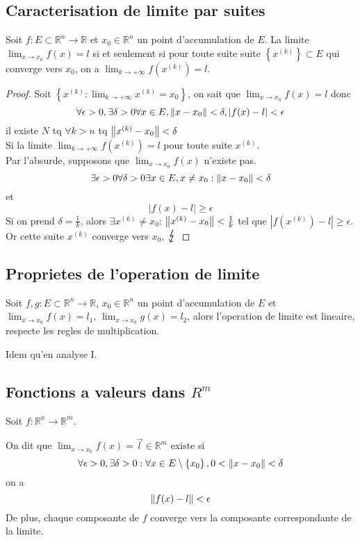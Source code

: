 \documentclass[../main.tex]{subfiles}
\begin{document}
\subsection{Caracterisation de limite par suites}
\begin{thm}\label{thm:Limites/Suiteslimites_suites}
	Soit $f:E \subset \mathbb{R}^n \to \mathbb{R}$ et $x_0 \in \mathbb{R}^n$ un point d'accumulation de $E$. La limite $\lim_{x \to x_0} f( x) =l$ si et seulement si pour toute suite suite $ \left\{ x^{( k) }\right\} \subset E $ qui converge vers $x_0$, on a $\lim_{k \to  + \infty} f(x^{( k) }) = l$.
\end{thm}
\begin{proof}
	Soit $ \left\{ x^{( k) }: \lim_{k \to  + \infty} x^{( k) }= x_0 \right\} $, on sait que $ \lim_{x \to x_0} f( x) =l$ donc
	\[ 
		\forall \epsilon>0, \exists \delta>0 \forall x \in E, \left\lVert x-x_0\right\rVert < \delta, |f( x) -l| < \epsilon
	\]
il existe $N$ tq $\forall k>n$ tq $\left\lVert x^{( k) }-x_0\right\rVert<\delta$\\
Si la limite $ \lim_{k \to  + \infty} f( x^{( k) }) = l$ pour toute suite $x^{( k) }$.\\
Par l'absurde, supposons que $ \lim_{x \to x_0} f( x) $ n'existe pas.\\
\[ 
	\exists \epsilon>0 \forall \delta>0 \exists x \in E, x\neq x_0: \left\lVert x-x_0\right\rVert < \delta 
\]
et
\[ 
	|f( x) -l| \geq \epsilon
\]
Si on prend $\delta=\frac{1}{k}$, alors $\exists x^{( k) }\neq x_0$: $\left\lVert x^{( k) }-x_{0}\right\rVert< \frac{1}{k} $ tel que $|f( x^{( k) }) -l| \geq \epsilon$.\\
Or cette suite $x^{( k) }$ converge vers $ x_0$, $\contra$
	
\end{proof}
\subsection{Proprietes de l'operation de limite}
Soit $f,g: E \subset \mathbb{R}^n \to \mathbb{R}$, $x_{0} \in \mathbb{R}^n$ un point d'accumulation de $E$ et $\lim_{x \to x_0} f( x) =l_1$, $\lim_{x \to x_0} g(x) =l_2$, alors
l'operation de limite est lineaire, respecte les regles de multiplication.
\begin{thm}\label{thm:Critere de Cauchycritere_de_cauchy}
	Idem qu'en analyse I.
\end{thm}
\subsection{Fonctions a valeurs dans $R^{m}$}
Soit $f: \mathbb{R}^n \to \mathbb{R}^m$.\\
\begin{defn}[Limite]
	On dit que $\lim_{x \to x_0} f( x) = \vec{l} \in \mathbb{R}^m$ existe si
\[ 
	\forall \epsilon>0, \exists \delta >0: \forall x \in E \setminus \left\{ x_0 \right\} , 0 < \left\lVert x-x_0\right\rVert < \delta
\]
on a
\[ 
	\left\lVert f( x) -l\right\rVert < \epsilon
\]
De plus, chaque composante de $f$ converge vers la composante correspondante de la limite.

	
\end{defn}
\end{document}
